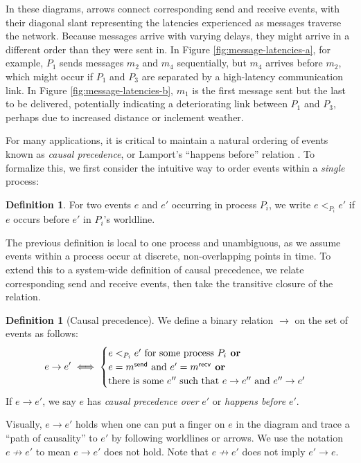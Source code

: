 \documentclass[]             %
{NASA}                       %
\theoremstyle{definition}
\newtheorem{definition}[theorem]{Definition}
\begin{document}
In these diagrams, arrows connect corresponding send and receive
events, with their diagonal slant representing the latencies
experienced as messages traverse the network. Because messages arrive
with varying delays, they might arrive in a different order than they
were sent in. In Figure \ref{fig:message-latencies-a}, for example,
$P_1$ sends messages $m_2$ and $m_4$ sequentially, but $m_4$ arrives
before $m_2$, which might occur if $P_1$ and $P_3$ are separated by a
high-latency communication link. In Figure
\ref{fig:message-latencies-b}, $m_1$ is the first message sent but the
last to be delivered, potentially indicating a deteriorating link
between $P_1$ and $P_3$, perhaps due to increased distance or
inclement weather.

For many applications, it is critical to maintain a natural ordering
of events known as \emph{causal precedence}, or Lamport's ``happens
before'' relation \cite{1978:lamportclocks}. To formalize this, we
first consider the intuitive way to order events within a
\emph{single} process:
\begin{definition}
  For two events $e$ and $e'$ occurring in process $P_i$, we
  write $e <_{P_i} e'$ if $e$ occurs before $e'$ in $P_i$'s
  worldline.
\end{definition}
The previous definition is local to one process and unambiguous, as we
assume events within a process occur at discrete, non-overlapping
points in time. To extend this to a system-wide definition of causal
precedence, we relate corresponding send and receive events, then take
the transitive closure of the relation.

\begin{definition}[Causal precedence]
  \label{def:causalprecedence}
  We define a binary relation $\to$ on the set of events as follows:
  \[e \to e' \iff
  \begin{cases}
    e <_{P_i} e' \textrm{ for some process $P_i$}
    \textbf{ or} \\
    e = m_{}^{\mathsf{send}} \textrm{ and } e' =m_{}^{\mathsf{recv}}
    \textbf{ or} \\
    \textrm{there is some } e'' \textrm{ such that } e \to e'' \textrm{ and } e'' \to e'
  \end{cases}
  \]
  If $e \to e'$, we say $e$ has \emph{causal precedence over} $e'$ or
  \emph{happens before} $e'$.
\end{definition}
Visually, $e \to e'$ holds when one can put a finger on $e$ in the
diagram and trace a ``path of causality'' to $e'$ by following
worldlines or arrows. We use the notation $e \not \to e'$ to mean
$e \to e'$ does not hold. Note that $e \not \to e'$ does not imply
$e' \to e$.
\end{document}
